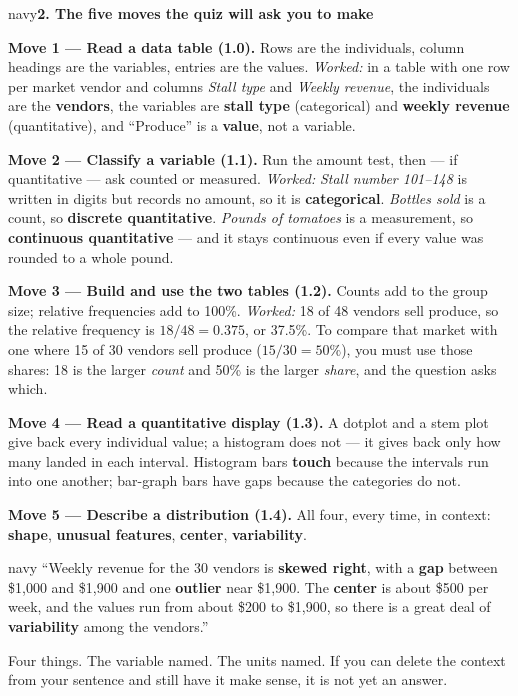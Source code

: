 \documentclass[12pt]{article}
\newcommand{\sghead}[1]{%
  \vspace{0.13in}
  \boxguard[10]
  \begin{headlinebox}{navy}\color{white}\bfseries\small #1\end{headlinebox}
  \vspace{0.09in}}
\begin{document}
\normalsize

\sghead{2. The five moves the quiz will ask you to make}

\small
\textbf{Move 1 --- Read a data table (1.0).} Rows are the individuals, column headings are the
variables, entries are the values. \emph{Worked:} in a table with one row per market vendor and
columns \emph{Stall type} and \emph{Weekly revenue}, the individuals are the \textbf{vendors},
the variables are \textbf{stall type} (categorical) and \textbf{weekly revenue} (quantitative),
and ``Produce'' is a \textbf{value}, not a variable.

\vspace{5pt}
\textbf{Move 2 --- Classify a variable (1.1).} Run the amount test, then --- if quantitative ---
ask counted or measured. \emph{Worked:} \emph{Stall number 101--148} is written in digits but
records no amount, so it is \textbf{categorical}. \emph{Bottles sold} is a count, so
\textbf{discrete quantitative}. \emph{Pounds of tomatoes} is a measurement, so
\textbf{continuous quantitative} --- and it stays continuous even if every value was rounded to a
whole pound.

\vspace{5pt}
\textbf{Move 3 --- Build and use the two tables (1.2).} Counts add to the group size; relative
frequencies add to 100\%. \emph{Worked:} 18 of 48 vendors sell produce, so the relative frequency
is $18/48 = 0.375$, or 37.5\%. To compare that market with one where 15 of 30 vendors sell
produce ($15/30 = 50\%$), you must use those shares: 18 is the larger \emph{count} and 50\% is
the larger \emph{share}, and the question asks which.

\vspace{5pt}
\textbf{Move 4 --- Read a quantitative display (1.3).} A dotplot and a stem plot give back every
individual value; a histogram does not --- it gives back only how many landed in each interval.
Histogram bars \textbf{touch} because the intervals run into one another; bar-graph bars have
gaps because the categories do not.

\vspace{5pt}
\textbf{Move 5 --- Describe a distribution (1.4).} All four, every time, in context:
\textbf{shape}, \textbf{unusual features}, \textbf{center}, \textbf{variability}.
\normalsize

\vspace{0.10in}
\boxguard[14]
\begin{scenariobox}{navy}
\small
``Weekly revenue for the 30 vendors is \textbf{skewed right}, with a \textbf{gap} between
\$1{,}000 and \$1{,}900 and one \textbf{outlier} near \$1{,}900. The \textbf{center} is about
\$500 per week, and the values run from about \$200 to \$1{,}900, so there is a great deal of
\textbf{variability} among the vendors.''
\par\vspace{4pt}
Four things. The variable named. The units named. If you can delete the context from your
sentence and still have it make sense, it is not yet an answer.
\end{scenariobox}
\end{document}
